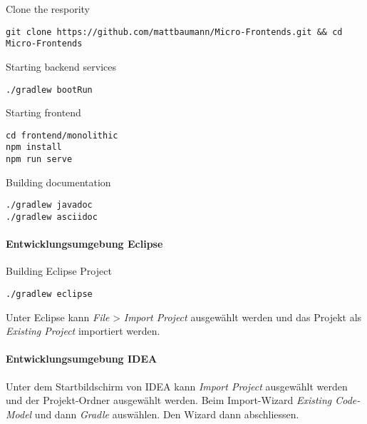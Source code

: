 Clone the respority
\begin{lstlisting}
git clone https://github.com/mattbaumann/Micro-Frontends.git && cd Micro-Frontends
\end{lstlisting}

Starting backend services
\begin{lstlisting}
./gradlew bootRun
\end{lstlisting}

Starting frontend
\begin{lstlisting}
cd frontend/monolithic
npm install
npm run serve
\end{lstlisting}

Building documentation
\begin{lstlisting}
./gradlew javadoc
./gradlew asciidoc
\end{lstlisting}

\paragraph{Entwicklungsumgebung Eclipse}

Building Eclipse Project
\begin{lstlisting}
./gradlew eclipse
\end{lstlisting}

Unter Eclipse kann \textit{File} > \textit{Import Project} ausgewählt werden und das Projekt als \textit{Existing Project} importiert werden.

\paragraph{Entwicklungsumgebung IDEA}

Unter dem Startbildschirm von IDEA kann \textit{Import Project} ausgewählt werden und der Projekt-Ordner ausgewählt werden. Beim Import-Wizard \textit{Existing Code-Model} und dann \textit{Gradle} auswählen. Den Wizard dann abschliessen.